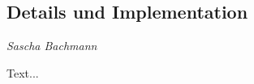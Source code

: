 \subsection{Details und Implementation}

\begin{center}
\emph{{\small Sascha Bachmann}}
\end{center}

\bigskip

Text...
